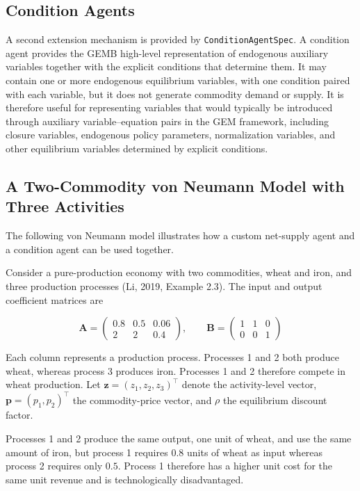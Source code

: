 \documentclass[
  letterpaper,
  DIV=11,
  numbers=noendperiod]{scrreprt}
\begin{document}
\subsection{Condition Agents}\label{condition-agents}

A second extension mechanism is provided by \texttt{ConditionAgentSpec}.
A condition agent provides the GEMB high-level representation of
endogenous auxiliary variables together with the explicit conditions
that determine them. It may contain one or more endogenous equilibrium
variables, with one condition paired with each variable, but it does not
generate commodity demand or supply. It is therefore useful for
representing variables that would typically be introduced through
auxiliary variable--equation pairs in the GEM framework, including
closure variables, endogenous policy parameters, normalization
variables, and other equilibrium variables determined by explicit
conditions.

\subsection{A Two-Commodity von Neumann Model with Three
Activities}\label{a-two-commodity-von-neumann-model-with-three-activities}

The following von Neumann model illustrates how a custom net-supply
agent and a condition agent can be used together.

Consider a pure-production economy with two commodities, wheat and iron,
and three production processes (Li, 2019, Example 2.3). The input and
output coefficient matrices are

\[
\mathbf A=
\begin{pmatrix}
0.8&0.5&0.06\\
2&2&0.4
\end{pmatrix},
\qquad
\mathbf B=
\begin{pmatrix}
1&1&0\\
0&0&1
\end{pmatrix}
\]

Each column represents a production process. Processes 1 and 2 both
produce wheat, whereas process 3 produces iron. Processes 1 and 2
therefore compete in wheat production. Let
\(\mathbf z=(z_1,z_2,z_3)^\top\) denote the activity-level vector,
\(\mathbf p=(p_1,p_2)^\top\) the commodity-price vector, and \(\rho\)
the equilibrium discount factor.

Processes 1 and 2 produce the same output, one unit of wheat, and use
the same amount of iron, but process 1 requires \(0.8\) units of wheat
as input whereas process 2 requires only \(0.5\). Process 1 therefore
has a higher unit cost for the same unit revenue and is technologically
disadvantaged.
\end{document}
